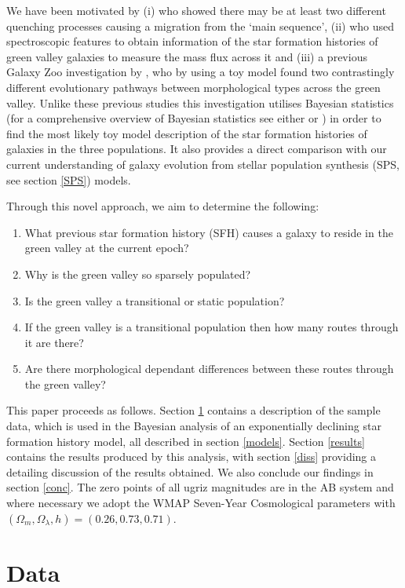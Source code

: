 \documentclass{mn2e}
\begin{document}
We have been motivated by (i) \citet{Peng} who showed there may be at least two different quenching processes causing a migration from the `main sequence', (ii) \citet{Martin07} who used spectroscopic features to obtain information of the star formation histories of green valley galaxies to measure the mass flux across it and (iii) a previous Galaxy Zoo investigation by  \cite{Sch2014}, who by using a toy model found two contrastingly different evolutionary pathways between morphological types across the green valley. Unlike these previous studies this investigation utilises Bayesian statistics (for a comprehensive overview of Bayesian statistics see either \citet{MacKay} or \citet{Sivia}) in order to find the most likely toy model description of the star formation histories of galaxies in the three populations. It also provides a direct comparison with our current understanding of galaxy evolution from stellar population synthesis (SPS, see section \ref{SPS}) models. 

Through this novel approach, we aim to determine the following:
\begin{enumerate}
\item What previous star formation history (SFH) causes a galaxy to reside in the green valley at the current epoch?
\item Why is the green valley so sparsely populated?
\item Is the green valley a transitional or static population? 
\item If the green valley is a transitional population then how many routes through it are there? 
\item Are there morphological dependant differences between these routes through the green valley? 
\end{enumerate}

This paper proceeds as follows. Section \ref{data} contains a description of the sample data, which is used in the Bayesian analysis of an exponentially declining star formation history model, all described in section \ref{models}. Section \ref{results} contains the results produced by this analysis, with section \ref{diss} providing a detailing discussion of the results obtained. We also conclude our findings in section \ref{conc}. The zero points of all ugriz magnitudes are in the AB system and where necessary we adopt the WMAP Seven-Year Cosmological parameters \citep{WMAP} with $(\Omega_m, \Omega_{\lambda}, h) = (0.26, 0.73, 0.71)$. 

\section{Data}\label{data}
\end{document}
